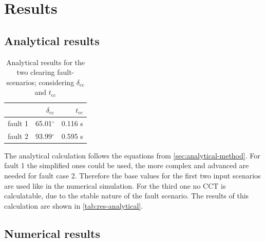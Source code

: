 \chapter{Results}
\label{chap:results}

\section{Analytical results}
\label{sec:analytical-results}

\begin{table}
        \vspace{-12pt}
        \small
        \centering
        \caption[Analytical results for the two clearing fault-scenarios]{Analytical results for the two clearing fault-scenarios; considering $\delta_\mathrm{cc}$ and $t_\mathrm{cc}$}
        \label{tab:res-analytical}
        \vspace{12pt}
        \begin{tabular}{|l|r|r|}
                \hline
                \rowcolor{lightgray} & $\delta_\mathrm{cc}$ & $t_\mathrm{cc}$  \\ \hline \hline
                fault 1              & 65.01$^\circ$        & 0.116 s                         \\ \hline
                fault 2              & 93.99$^\circ$        & 0.595 s \\ \hline
        \end{tabular}
\end{table}
The analytical calculation follows the equations from \autoref{sec:analytical-method}. For fault 1 the simplified ones could be used, the more complex and advanced are needed for fault case 2. Therefore the base values for the first two input scenarios are used like in the numerical simulation. For the third one no \acs{CCT} is calculatable, due to the stable nature of the fault scenario. The results of this calculation are shown in \autoref{tab:res-analytical}.


\section{Numerical results}

